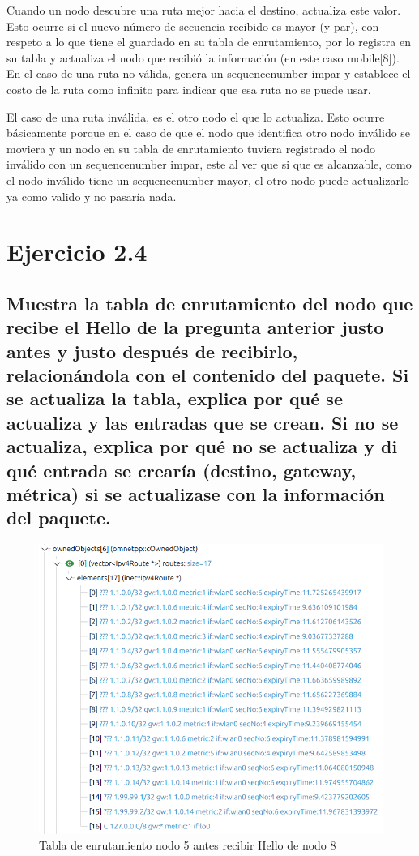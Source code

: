 Cuando un nodo descubre una ruta mejor hacia el destino, actualiza este valor. Esto ocurre si el nuevo número de secuencia recibido es mayor (y par), con respeto a lo que tiene el guardado en su tabla de enrutamiento, por lo registra en su tabla y actualiza el nodo que recibió la información (en este caso mobile[8]). En el caso de una ruta no válida, genera un sequencenumber impar y establece el costo de la ruta como infinito para indicar que esa ruta no se puede usar.

El caso de una ruta inválida, es el otro nodo el que lo actualiza. Esto ocurre básicamente porque en el caso de que el nodo que identifica otro nodo inválido se moviera y un nodo en su tabla de enrutamiento tuviera registrado el nodo inválido con un sequencenumber impar, este al ver que si que es alcanzable, como el nodo inválido tiene un sequencenumber mayor, el otro nodo puede actualizarlo ya como valido y no pasaría nada.

\section{Ejercicio 2.4}

\subsection{Muestra la tabla de enrutamiento del nodo que recibe el Hello de la pregunta anterior justo antes y justo
después de recibirlo, relacionándola con el contenido del paquete. Si se actualiza la tabla, explica por qué se
actualiza y las entradas que se crean. Si no se actualiza, explica por qué no se actualiza y di qué entrada se
crearía (destino, gateway, métrica) si se actualizase con la información del paquete.}

\begin{figure}[H]
    \centering
    \includegraphics[width=115mm, scale=0.75]{imaxes/dsdv/ejercicio2_4_nodo5.png}
    \caption{Tabla de enrutamiento nodo 5 antes recibir Hello de nodo 8}
    \label{fig:ejer2_4_1}
\end{figure}

